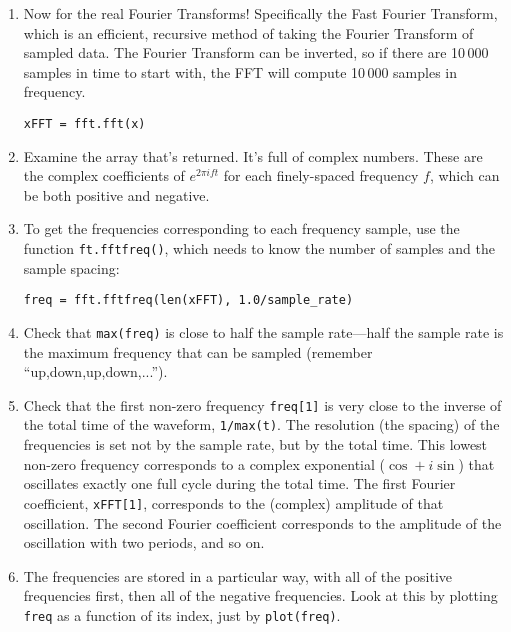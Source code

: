 \documentclass[11pt]{hmcpset}
\begin{document}
\begin{solution}
	\vfill
\end{solution}
\pagebreak



\begin{problem}
	\begin{enumerate}
		\item Now for the real Fourier Transforms! Specifically the Fast Fourier Transform, which is an efficient, recursive method of taking the Fourier Transform of sampled data. The Fourier Transform can be inverted, so if there are 10\,000 samples in time to start with, the FFT will compute 10\,000 samples in frequency.
\begin{lstlisting}[style=Python]
xFFT = fft.fft(x)
\end{lstlisting}
\vspace{-1em}
		\item Examine the array that's returned. It's full of complex numbers. These are the complex coefficients of $e^{2 \pi i f t}$ for each finely-spaced frequency $f$, which can be both positive and negative.
		\item To get the frequencies corresponding to each frequency sample, use the function \texttt{ft.fftfreq()}, which needs to know the number of samples and the sample spacing:
\begin{lstlisting}[style=Python]
freq = fft.fftfreq(len(xFFT), 1.0/sample_rate)
\end{lstlisting}
\vspace{-1em}
	    \item Check that \texttt{max(freq)} is close to half the sample rate---half the sample rate is the maximum frequency that can be sampled (remember ``up,down,up,down,...'').
	    \item Check that the first non-zero frequency \texttt{freq[1]} is very close to the inverse of the total time of the waveform, \texttt{1/max(t)}. The resolution (the spacing) of the frequencies is set not by the sample rate, but by the total time. This lowest non-zero frequency corresponds to a complex exponential ($\cos+i \sin$) that oscillates exactly one full cycle during the total time. The first Fourier coefficient, \texttt{xFFT[1]}, corresponds to the (complex) amplitude of that oscillation. The second Fourier coefficient corresponds to the amplitude of the oscillation with two periods, and so on.
	    \item The frequencies are stored in a particular way, with all of the positive frequencies first, then all of the negative frequencies. Look at this by plotting \texttt{freq} as a function of its index, just by \texttt{plot(freq)}.

\end{enumerate}
\end{problem}
\end{document}
